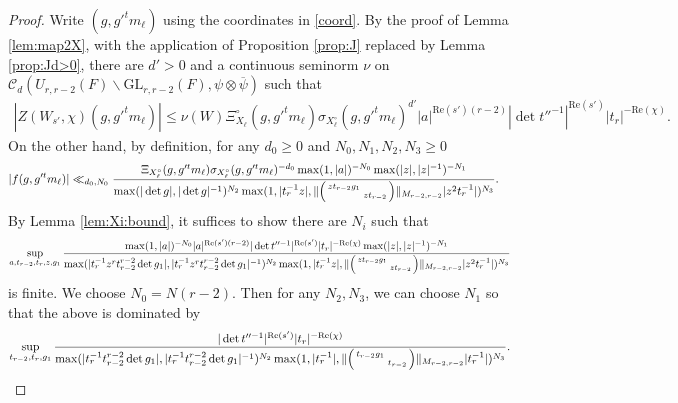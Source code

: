 \documentclass[12pt]{amsart}
\theoremstyle{remark}
\numberwithin{equation}{section}
\newcommand{\GL}{\mathrm{GL}}
\theoremstyle{definition}
\newenvironment{psmatrix}
  {\left(\begin{smallmatrix}}
  {\end{smallmatrix}\right)}
\numberwithin{equation}{subsection}
\newcommand{\norm}[1]{\lVert#1\rVert}
\begin{document}
\begin{proof} 
Write $(g,g'^tm_\ell)$ using the coordinates in \eqref{coord}. 
By the proof of  Lemma \ref{lem:map2X}, with 
the application of Proposition \ref{prop:J} replaced by 
 Lemma \ref{prop:Jd>0},
there are $d'>0$ and a continuous seminorm $\nu$ on $\mathcal{C}_d(U_{r,r-2}(F) \backslash \GL_{r,r-2}(F),\psi \otimes \overline{\psi})$ such that 
\begin{align*}
    \left|Z(W_{s'},\chi)(g,g'^tm_{\ell})\right|\le \nu(W)\Xi_{X_\ell}^\circ(g,g'^tm_\ell)\sigma_{X_\ell^\circ}(g,g'^tm_\ell)^{d'}|a|^{\mathrm{Re}(s')(r-2)}|\det t''^{-1}|^{\mathrm{Re}(s')}|t_r|^{-\mathrm{Re}(\chi)}.
\end{align*} 
On the other hand, by definition, for any $d_0\ge 0$ and $N_0,N_1,N_2,N_3\ge 0$ 
\begin{align*}
|f(g,g'^tm_\ell)|&\ll_{d_0,N_0}\frac{\Xi_{X_\ell^\circ}(g,g'^tm_\ell)\sigma_{X_\ell^\circ}(g,g'^tm_\ell)^{-d_0}\max(1,|a|)^{-N_0}\max(|z|,|z|^{-1})^{-N_1}}{ \max(|\det g|,|\det g|^{-1})^{N_2}\max(1,|t_r^{-1}z|,\norm{\begin{psmatrix} zt_{r-2}g_1 &  \\ & zt_{r-2} \end{psmatrix}}_{M_{r-2,r-2}}|z^2t_r^{-1}|)^{N_3}}.
\end{align*}
By Lemma \ref{lem:Xi:bound}, it suffices to show there are $N_i$ such that
\begin{align*}
    \sup_{a,t_{r-2},t_r,z,g_1}\frac{\max(1,|a|)^{-N_0}|a|^{\mathrm{Re}(s')(r-2)}|\det t''^{-1}|^{\mathrm{Re}(s')}|t_r|^{-\mathrm{Re}(\chi)}\max(|z|,|z|^{-1})^{-N_1}}{ \max(|t_{r}^{-1}z^rt_{r-2}^{r-2}\det g_1|,|t_r^{-1}z^rt_{r-2}^{r-2}\det g_1|^{-1})^{N_2}\max(1,|t_r^{-1}z|,\norm{\begin{psmatrix} zt_{r-2}g_1 &  \\ & zt_{r-2} \end{psmatrix}}_{M_{r-2,r-2}}|z^2t_r^{-1}|)^{N_3}}
\end{align*}
is finite. 
We choose $N_0=N(r-2).$  Then for any $N_2,N_3$, we can choose $N_1$ so that the above is dominated by 
   \begin{align*}
    \sup_{t_{r-2},t_r,g_1}\frac{|\det t''^{-1}|^{\mathrm{Re}(s')}|t_r|^{-\mathrm{Re}(\chi)}}{ \max(|t_{r}^{-1}t_{r-2}^{r-2}\det g_1|,|t_r^{-1}t_{r-2}^{r-2}\det g_1|^{-1})^{N_2}\max(1,|t_r^{-1}|,\norm{\begin{psmatrix} t_{r-2}g_1 &  \\ & t_{r-2} \end{psmatrix}}_{M_{r-2,r-2}}|t_r^{-1}|)^{N_3}}.

\end{align*}
\end{proof}
\end{document}
